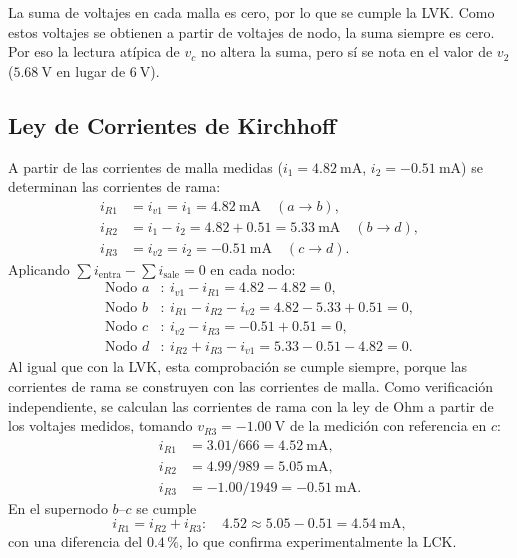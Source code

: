 \documentclass[conference,10pt]{IEEEtran}
\begin{document}
La suma de voltajes en cada malla es cero, por lo que se cumple la LVK. Como estos voltajes se obtienen a partir de voltajes de nodo, la suma siempre es cero. Por eso la lectura atípica de $v_c$ no altera la suma, pero sí se nota en el valor de $v_2$ ($5.68~\mathrm{V}$ en lugar de $6~\mathrm{V}$).

\subsection{Ley de Corrientes de Kirchhoff}
A partir de las corrientes de malla medidas ($i_1=4.82~\mathrm{mA}$, $i_2=-0.51~\mathrm{mA}$) se determinan las corrientes de rama:
\begin{align*}
  i_{R1} &= i_{v1} = i_1 = 4.82~\mathrm{mA} \quad (a\to b),\\
  i_{R2} &= i_1 - i_2 = 4.82 + 0.51 = 5.33~\mathrm{mA} \quad (b\to d),\\
  i_{R3} &= i_{v2} = i_2 = -0.51~\mathrm{mA} \quad (c\to d).
\end{align*}
Aplicando $\sum i_{\text{entra}} - \sum i_{\text{sale}} = 0$ en cada nodo:
\begin{align*}
  \text{Nodo } a&:\ i_{v1} - i_{R1} = 4.82 - 4.82 = 0,\\
  \text{Nodo } b&:\ i_{R1} - i_{R2} - i_{v2} = 4.82 - 5.33 + 0.51 = 0,\\
  \text{Nodo } c&:\ i_{v2} - i_{R3} = -0.51 + 0.51 = 0,\\
  \text{Nodo } d&:\ i_{R2} + i_{R3} - i_{v1} = 5.33 - 0.51 - 4.82 = 0.
\end{align*}
Al igual que con la LVK, esta comprobación se cumple siempre, porque las corrientes de rama se construyen con las corrientes de malla. Como verificación independiente, se calculan las corrientes de rama con la ley de Ohm a partir de los voltajes medidos, tomando $v_{R3}=-1.00~\mathrm{V}$ de la medición con referencia en $c$:
\begin{align*}
  i_{R1} &= 3.01/666 = 4.52~\mathrm{mA},\\
  i_{R2} &= 4.99/989 = 5.05~\mathrm{mA},\\
  i_{R3} &= -1.00/1949 = -0.51~\mathrm{mA}.
\end{align*}
En el supernodo $b$--$c$ se cumple
\begin{equation*}
  i_{R1} = i_{R2} + i_{R3}:\quad 4.52 \approx 5.05 - 0.51 = 4.54~\mathrm{mA},
\end{equation*}
con una diferencia del $0.4\,\%$, lo que confirma experimentalmente la LCK.
\end{document}
